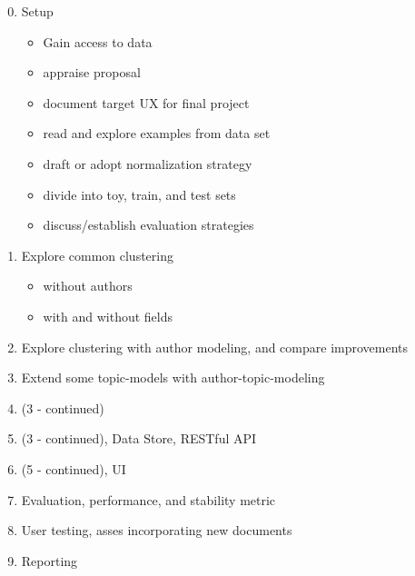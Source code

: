 \documentclass{article}
\begin{document}
\begin{multicols}{2}
\begin{enumerate}[\texttt{WK} 1 -]
  \setcounter{enumi}{-1}
\item Setup
  \begin{itemize}
  \item Gain access to data
  \item appraise proposal
  \item document target UX for final project
  \item read and explore examples from data set
  \item draft or adopt normalization strategy
  \item divide into toy, train, and test sets
  \item discuss/establish evaluation strategies
  \end{itemize}
\item Explore common clustering
  \begin{itemize}
  \item without authors
  \item with and without fields
  \end{itemize}
\item Explore clustering with author modeling, and compare improvements
\item Extend some topic-models with author-topic-modeling
\item (3 - continued)
\item (3 - continued), Data Store, RESTful API
\item (5 - continued), UI
\item Evaluation, performance, and stability metric
\item User testing, asses incorporating new documents
\item Reporting
\end{enumerate}


\begin{comment}


\end{comment}
\end{multicols}
\end{document}
